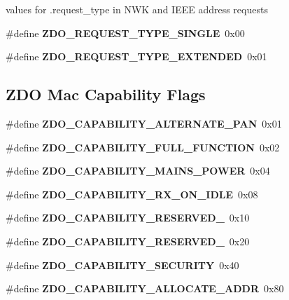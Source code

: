 \label{_amgrp01747264fe7bf50731df0522c351974e}%
values for {\ttfamily }.request\+\_\+type in N\+WK and I\+E\+EE address requests \begin{DoxyCompactItemize}
\item 
\mbox{\label{group__zdo_gaa2e60574e4f18025365955f61787b512}} 
\#define {\bfseries Z\+D\+O\+\_\+\+R\+E\+Q\+U\+E\+S\+T\+\_\+\+T\+Y\+P\+E\+\_\+\+S\+I\+N\+G\+LE}~0x00
\item 
\mbox{\label{group__zdo_ga0090806cf0aab326024524fec4c8339a}} 
\#define {\bfseries Z\+D\+O\+\_\+\+R\+E\+Q\+U\+E\+S\+T\+\_\+\+T\+Y\+P\+E\+\_\+\+E\+X\+T\+E\+N\+D\+ED}~0x01
\end{DoxyCompactItemize}
\subsection*{Z\+DO Mac Capability Flags}
\begin{DoxyCompactItemize}
\item 
\mbox{\label{group__zdo_ga37c6821b48ca70aef7c64b1f3763571d}} 
\#define {\bfseries Z\+D\+O\+\_\+\+C\+A\+P\+A\+B\+I\+L\+I\+T\+Y\+\_\+\+A\+L\+T\+E\+R\+N\+A\+T\+E\+\_\+\+P\+AN}~0x01
\item 
\mbox{\label{group__zdo_gaf94e4d8a7b20ab1cbb3fba7bc0dd1c41}} 
\#define {\bfseries Z\+D\+O\+\_\+\+C\+A\+P\+A\+B\+I\+L\+I\+T\+Y\+\_\+\+F\+U\+L\+L\+\_\+\+F\+U\+N\+C\+T\+I\+ON}~0x02
\item 
\mbox{\label{group__zdo_gab04c9345bdf68648eec414b84e1f87c6}} 
\#define {\bfseries Z\+D\+O\+\_\+\+C\+A\+P\+A\+B\+I\+L\+I\+T\+Y\+\_\+\+M\+A\+I\+N\+S\+\_\+\+P\+O\+W\+ER}~0x04
\item 
\mbox{\label{group__zdo_ga88e90d61371411240533e1a939c79671}} 
\#define {\bfseries Z\+D\+O\+\_\+\+C\+A\+P\+A\+B\+I\+L\+I\+T\+Y\+\_\+\+R\+X\+\_\+\+O\+N\+\_\+\+I\+D\+LE}~0x08
\item 
\mbox{\label{group__zdo_gacd166110237f016d80559f0a001f8d28}} 
\#define {\bfseries Z\+D\+O\+\_\+\+C\+A\+P\+A\+B\+I\+L\+I\+T\+Y\+\_\+\+R\+E\+S\+E\+R\+V\+E\+D\+\_}~0x10
\item 
\mbox{\label{group__zdo_ga149bb219f6e1e84e51d60650124e46cc}} 
\#define {\bfseries Z\+D\+O\+\_\+\+C\+A\+P\+A\+B\+I\+L\+I\+T\+Y\+\_\+\+R\+E\+S\+E\+R\+V\+E\+D\+\_}~0x20
\item 
\mbox{\label{group__zdo_gafccc4c34b99048dd420457b867c4d158}} 
\#define {\bfseries Z\+D\+O\+\_\+\+C\+A\+P\+A\+B\+I\+L\+I\+T\+Y\+\_\+\+S\+E\+C\+U\+R\+I\+TY}~0x40
\item 
\mbox{\label{group__zdo_gaf97614279526a70a93516e8ac3be9024}} 
\#define {\bfseries Z\+D\+O\+\_\+\+C\+A\+P\+A\+B\+I\+L\+I\+T\+Y\+\_\+\+A\+L\+L\+O\+C\+A\+T\+E\+\_\+\+A\+D\+DR}~0x80
\end{DoxyCompactItemize}
